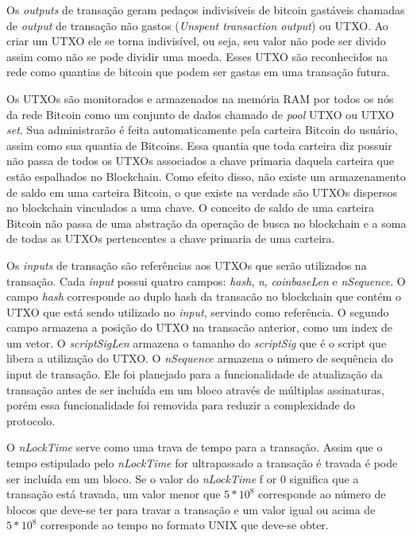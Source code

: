 \documentclass[conference,compsoc]{IEEEtran}
\begin{document}
Os \textit{outputs} de transação geram pedaços indivisíveis de bitcoin gastáveis chamadas de  \textit{output} de transação não gastos (\textit{Unspent transaction output}) ou UTXO. Ao criar um UTXO ele se torna indivisível, ou seja, seu valor não pode ser divido assim como não se pode dividir uma moeda. Esses UTXO são reconhecidos na rede como quantias de bitcoin que podem ser gastas em uma transação futura.

Os UTXOs são monitorados e armazenados na memória RAM por todos os nós da rede Bitcoin como um conjunto de dados chamado de \textit{pool} UTXO ou UTXO \textit{set}. Sua administrarão é feita automaticamente pela carteira Bitcoin do usuário, assim como sua quantia de Bitcoins. Essa quantia que toda carteira diz possuir não passa de todos os UTXOs associados a chave primaria daquela carteira que estão espalhados no Blockchain. Como efeito disso, não existe um armazenamento de saldo em uma carteira Bitcoin, o que existe na verdade são UTXOs dispersos no blockchain vinculados a uma chave. O conceito de saldo de uma carteira Bitcoin não passa de uma abstração da operação de busca no blockchain e a soma de todas as UTXOs pertencentes a chave primaria de uma carteira.

Os \textit{inputs} de transação são referências aos UTXOs que serão utilizados na transação. Cada \textit{input} possui quatro campos: \textit{hash}, \textit{n}, \textit{coinbaseLen} e \textit{nSequence}. O campo \textit{hash} corresponde ao duplo hash da transacão no blockchain que contém o UTXO que está sendo utilizado no \textit{input}, servindo como referência. O segundo campo armazena a posição do UTXO na transacão anterior, como um index de um vetor. O \textit{scriptSigLen} armazena o tamanho do \textit{scriptSig} que é o script que libera a utilização do UTXO. O \textit{nSequence} armazena o número de sequência do input de transação. Ele foi planejado para a funcionalidade de atualização da transação antes de ser incluída em um bloco através de múltiplas assinaturas, porém essa funcionalidade foi removida para reduzir a complexidade do protocolo.

O \textit{nLockTime} serve como uma trava de tempo para a transação. Assim que o tempo estipulado pelo \textit{nLockTime} for ultrapassado a transação é travada é pode ser incluída em um bloco. Se o valor do \textit{nLockTime} f	or 0 significa que a transação está travada, um valor menor que $5*10^8$ corresponde ao número de blocos que deve-se ter para travar a transação e um valor igual ou acima de $5*10^8$ corresponde ao tempo no formato UNIX que deve-se obter.
\end{document}
